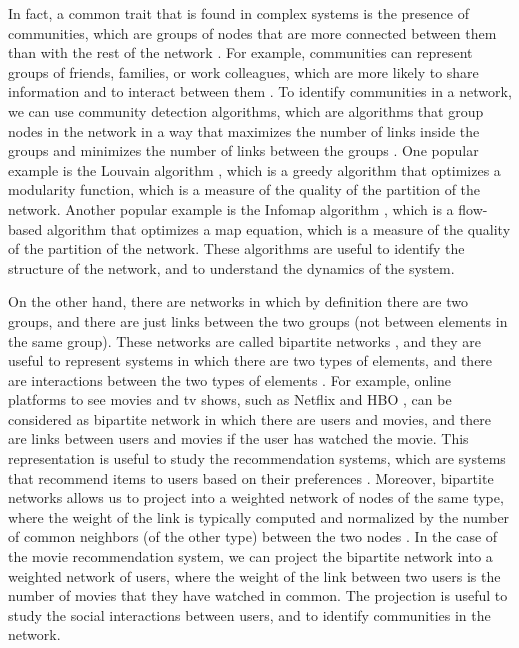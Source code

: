 In fact, a common trait that is found in complex systems is the presence of communities, which are groups of nodes that are more connected between them than with the rest of the network \cite{girvan-2002}. For example, communities can represent groups of friends, families, or work colleagues, which are more likely to share information and to interact between them \cite{newman2001structure}. To identify communities in a network, we can use community detection algorithms, which are algorithms that group nodes in the network in a way that maximizes the number of links inside the groups and minimizes the number of links between the groups \cite{lancichinetti-2008,fortunato2010community}. One popular example is the Louvain algorithm \cite{blondel-2008}, which is a greedy algorithm that optimizes a modularity function, which is a measure of the quality of the partition of the network. Another popular example is the Infomap algorithm \cite{rosvall-2008}, which is a flow-based algorithm that optimizes a map equation, which is a measure of the quality of the partition of the network. These algorithms are useful to identify the structure of the network, and to understand the dynamics of the system.

On the other hand, there are networks in which by definition there are two groups, and there are just links between the two groups (not between elements in the same group). These networks are called bipartite networks \cite{newman2001structure}, and they are useful to represent systems in which there are two types of elements, and there are interactions between the two types of elements \cite{latapy-2008}. For example, online platforms to see movies and tv shows, such as Netflix \cite{netflix} and HBO \cite{HBO}, can be considered as bipartite network in which there are users and movies, and there are links between users and movies if the user has watched the movie. This representation is useful to study the recommendation systems, which are systems that recommend items to users based on their preferences \cite{ricci-2011}. Moreover, bipartite networks allows us to project into a weighted network of nodes of the same type, where the weight of the link is typically computed and normalized by the number of common neighbors (of the other type) between the two nodes \cite{newman-2001-collaboration}. In the case of the movie recommendation system, we can project the bipartite network into a weighted network of users, where the weight of the link between two users is the number of movies that they have watched in common. The projection is useful to study the social interactions between users, and to identify communities in the network.

